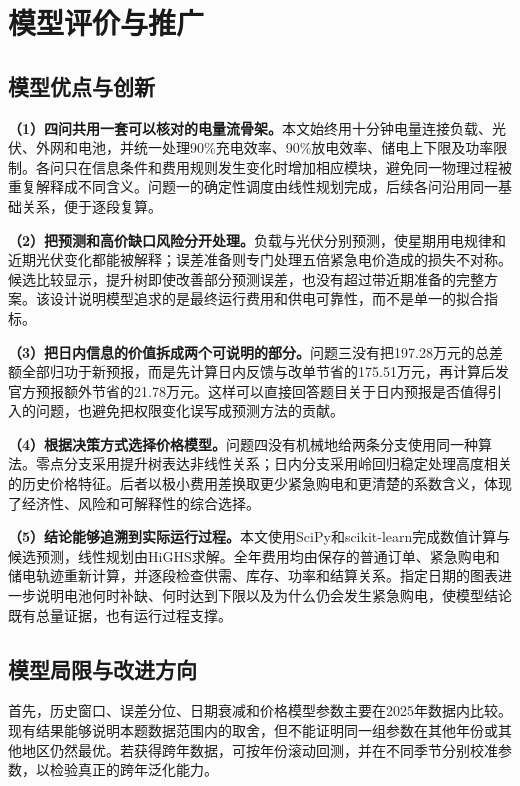 \section{模型评价与推广}

\subsection{模型优点与创新}

\textbf{（1）四问共用一套可以核对的电量流骨架。}本文始终用十分钟电量连接负载、光伏、外网和电池，并统一处理90\%充电效率、90\%放电效率、储电上下限及功率限制。各问只在信息条件和费用规则发生变化时增加相应模块，避免同一物理过程被重复解释成不同含义。问题一的确定性调度由线性规划完成\cite{dantzig}，后续各问沿用同一基础关系，便于逐段复算。

\textbf{（2）把预测和高价缺口风险分开处理。}负载与光伏分别预测，使星期用电规律和近期光伏变化都能被解释\cite{hyndman}；误差准备则专门处理五倍紧急电价造成的损失不对称。候选比较显示，提升树即使改善部分预测误差，也没有超过带近期准备的完整方案。该设计说明模型追求的是最终运行费用和供电可靠性，而不是单一的拟合指标。

\textbf{（3）把日内信息的价值拆成两个可说明的部分。}问题三没有把197.28万元的总差额全部归功于新预报，而是先计算日内反馈与改单节省的175.51万元，再计算后发官方预报额外节省的21.78万元。这样可以直接回答题目关于日内预报是否值得引入的问题，也避免把权限变化误写成预测方法的贡献。

\textbf{（4）根据决策方式选择价格模型。}问题四没有机械地给两条分支使用同一种算法。零点分支采用提升树表达非线性关系\cite{friedman}；日内分支采用岭回归稳定处理高度相关的历史价格特征\cite{hoerl}。后者以极小费用差换取更少紧急购电和更清楚的系数含义，体现了经济性、风险和可解释性的综合选择。

\textbf{（5）结论能够追溯到实际运行过程。}本文使用SciPy和scikit-learn完成数值计算与候选预测\cite{virtanen,pedregosa}，线性规划由HiGHS求解\cite{huangfu}。全年费用均由保存的普通订单、紧急购电和储电轨迹重新计算，并逐段检查供需、库存、功率和结算关系。指定日期的图表进一步说明电池何时补缺、何时达到下限以及为什么仍会发生紧急购电，使模型结论既有总量证据，也有运行过程支撑。

\subsection{模型局限与改进方向}

首先，历史窗口、误差分位、日期衰减和价格模型参数主要在2025年数据内比较。现有结果能够说明本题数据范围内的取舍，但不能证明同一组参数在其他年份或其他地区仍然最优。若获得跨年数据，可按年份滚动回测，并在不同季节分别校准参数，以检验真正的跨年泛化能力。

